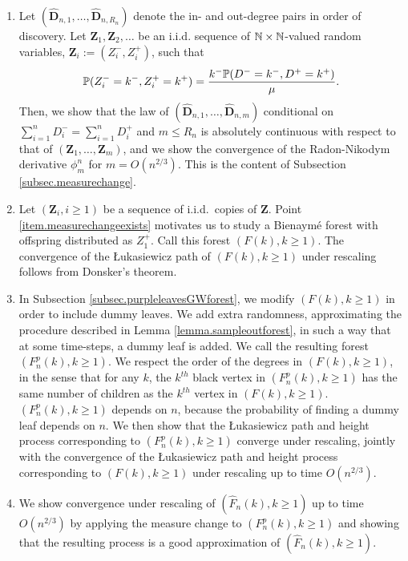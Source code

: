 \begin{enumerate}
    \item \label{item.measurechangeexists} Let $(\mathbf{\hat{D}}_{n,1},\dots,\mathbf{\hat{D}}_{n,R_n})$ denote the in- and out-degree pairs in order of discovery. Let $\mathbf{Z}_1, \mathbf{Z}_2, \ldots$ be an i.i.d. sequence of $\N\times \N$-valued random variables, $\mathbf{Z}_i:=(Z_i^-,Z_i^+)$, such that 
    $$\P(Z_i^-=k^-, Z_i^+=k^+)=\frac{k^-\P(D^-=k^-,D^+=k^+)}{\mu}.$$
    Then, we show that the law of $(\mathbf{\hat{D}}_{n,1},\dots,\mathbf{\hat{D}}_{n,m})$ conditional on $\sum_{i=1}^n D_i^-=\sum_{i=1}^n D_i^+$ and $m \leq R_n$ is absolutely continuous with respect to that of $(\mathbf{Z}_1,\dots, \mathbf{Z}_m)$, and we show the convergence of the Radon-Nikodym derivative $\phi_m^n$ for $m=O(n^{2/3})$. This is the content of Subsection \ref{subsec.measurechange}.
    \item Let $(\mathbf{Z}_i,i\geq 1)$ be a sequence of i.i.d.\ copies of $\mathbf{Z}$. Point \ref{item.measurechangeexists} motivates us to study a Bienaymé forest with offspring distributed as $Z_1^+$. Call this forest $(F(k),k\geq 1)$. The convergence of the \L ukasiewicz path of $(F(k),k\geq 1)$ under rescaling follows from Donsker's theorem.
    \item In Subsection \ref{subsec.purpleleavesGWforest}, we modify $(F(k),k\geq 1)$ in order to include dummy leaves. We add extra randomness, approximating the procedure described in Lemma \ref{lemma.sampleoutforest}, in such a way that at some time-steps, a dummy leaf is added. We call the resulting forest $(F^p_n(k),k\geq 1)$. We respect the order of the degrees in $(F(k),k\geq 1)$, in the sense that for any $k$, the $k^{th}$ black vertex in $(F^p_n(k),k\geq 1)$ has the same number of children as the $k^{th}$ vertex in $(F(k),k\geq 1)$. $(F^p_n(k),k\geq 1)$ depends on $n$, because the probability of finding a dummy leaf depends on $n$. We then show that the \L ukasiewicz path and height process corresponding to $(F^p_n(k),k\geq 1)$ converge under rescaling, jointly with the convergence of the \L ukasiewicz path and height process corresponding to $(F(k),k\geq 1)$ under rescaling up to time $O(n^{2/3})$.
    \item We show convergence under rescaling of $(\hat{F}_n(k),k\geq 1)$ up to time $O(n^{2/3})$ by applying the measure change to $(F^p_n(k),k\geq 1)$ and showing that the resulting process is a good approximation of $(\hat{F}_n(k),k\geq 1)$. 
\end{enumerate}

